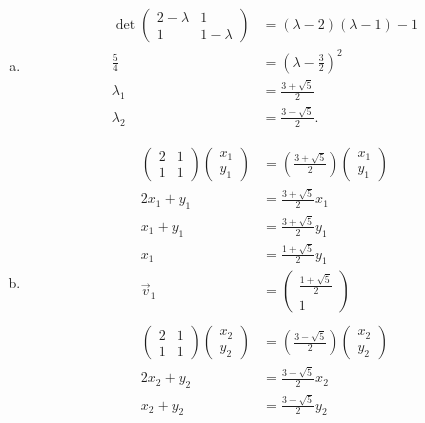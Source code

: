 \documentclass[10pt]{mypackage}
\begin{document}
\begin{enumerate}[(a)]
  \item 
    \begin{align*}
      \det \begin{pmatrix}2-\lambda & 1 \\ 1 & 1-\lambda\end{pmatrix} &= \left(\lambda -2\right)\left(\lambda - 1\right)-1\\
      \frac{5}{4} &= \left(\lambda - \frac{3}{2}\right)^2\\
      \lambda_1 &= \frac{3 + \sqrt{5}}{2}\\
      \lambda_2 &= \frac{3-\sqrt{5}}{2}.
    \end{align*}
  \item 
    \begin{align*}
      \begin{pmatrix}2 & 1 \\ 1 & 1 \end{pmatrix} \begin{pmatrix}x_1\\y_1\end{pmatrix} &= \left(\frac{3 + \sqrt{5}}{2}\right) \begin{pmatrix}x_1\\y_1\end{pmatrix}\\
      2x_1 + y_1 &= \frac{3 + \sqrt{5}}{2}x_1\\
      x_1 + y_1 &= \frac{3 + \sqrt{5}}{2}y_1\\
      x_1 &= \frac{1 + \sqrt{5}}{2}y_1\\
      \vec{v}_1 &= \begin{pmatrix}\frac{1+\sqrt{5}}{2}\\1\end{pmatrix}\\
\\
      \begin{pmatrix}2 & 1 \\ 1 & 1 \end{pmatrix} \begin{pmatrix}x_2\\y_2\end{pmatrix} &= \left(\frac{3 - \sqrt{5}}{2}\right) \begin{pmatrix}x_2\\y_2\end{pmatrix}\\
      2x_2 + y_2 &= \frac{3-\sqrt{5}}{2}x_2\\
      x_2 + y_2 &= \frac{3-\sqrt{5}}{2}y_2\\

\end{align*}
\end{enumerate}
\end{document}
